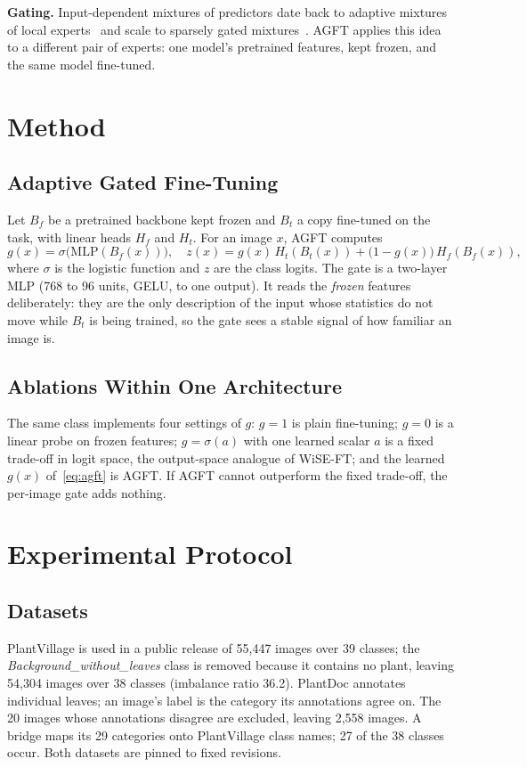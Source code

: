 \documentclass[conference]{IEEEtran}
\begin{document}
\textbf{Gating.} Input-dependent mixtures of predictors date back to adaptive mixtures of local experts~\cite{jacobs1991adaptive} and scale to sparsely gated mixtures~\cite{shazeer2017outrageously}. AGFT applies this idea to a different pair of experts: one model's pretrained features, kept frozen, and the same model fine-tuned.

\section{Method}
\subsection{Adaptive Gated Fine-Tuning}
Let $B_f$ be a pretrained backbone kept frozen and $B_t$ a copy fine-tuned on the task, with linear heads $H_f$ and $H_t$. For an image $x$, AGFT computes
\begin{equation}
g(x) = \sigma\big(\mathrm{MLP}(B_f(x))\big), \quad
z(x) = g(x)\, H_t(B_t(x)) + \big(1 - g(x)\big)\, H_f(B_f(x)),
\label{eq:agft}
\end{equation}
where $\sigma$ is the logistic function and $z$ are the class logits. The gate is a two-layer MLP (768 to 96 units, GELU, to one output). It reads the \emph{frozen} features deliberately: they are the only description of the input whose statistics do not move while $B_t$ is being trained, so the gate sees a stable signal of how familiar an image is.

\subsection{Ablations Within One Architecture}
The same class implements four settings of $g$: $g{=}1$ is plain fine-tuning; $g{=}0$ is a linear probe on frozen features; $g{=}\sigma(a)$ with one learned scalar $a$ is a fixed trade-off in logit space, the output-space analogue of WiSE-FT; and the learned $g(x)$ of~\eqref{eq:agft} is AGFT. If AGFT cannot outperform the fixed trade-off, the per-image gate adds nothing.

\section{Experimental Protocol}
\subsection{Datasets}
PlantVillage is used in a public release of 55,447 images over 39 classes; the \textit{Background\_without\_leaves} class is removed because it contains no plant, leaving 54,304 images over 38 classes (imbalance ratio 36.2). PlantDoc annotates individual leaves; an image's label is the category its annotations agree on. The 20 images whose annotations disagree are excluded, leaving 2,558 images. A bridge maps its 29 categories onto PlantVillage class names; 27 of the 38 classes occur. Both datasets are pinned to fixed revisions.
\end{document}
